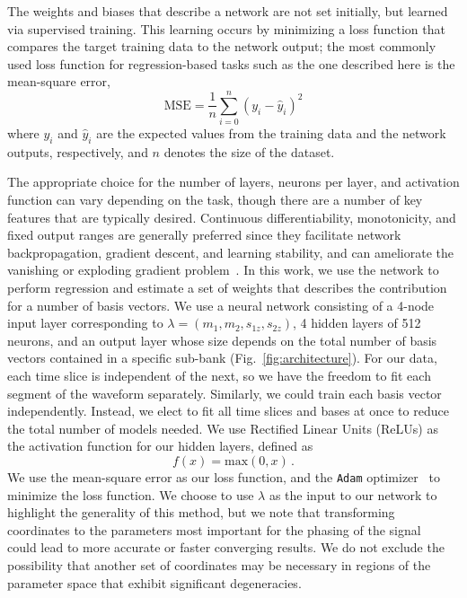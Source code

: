 \documentclass[twocolumn,prd,superscriptaddress,nofootinbib]{revtex4-1}
\begin{document}
The
weights and biases that describe a network are not set initially, but learned
via supervised training. This learning occurs by minimizing a loss function
that compares the target training data to the network output; the most commonly
used loss function for regression-based tasks such as the one described here is the mean-square error,
\begin{equation}
\mathrm{MSE} = \frac{1}{n}\sum_{i = 0}^{n} (y_i - \hat{y}_i)^2
\end{equation}
where $y_i$ and $\hat{y}_i$ are the expected values from the
training data and the network outputs, respectively, and $n$ denotes the size of the dataset.

The appropriate choice for the number of layers, neurons per layer, and
activation function can vary depending on the task, though there are a number of
key features that are typically desired. Continuous differentiability, monotonicity,
and fixed output ranges are generally preferred since they facilitate network
backpropagation, gradient descent, and learning stability, and can ameliorate the
vanishing or exploding gradient problem~\cite{Goodfellow-et-al-2016}. In this
work,
we use the network to perform regression and estimate a set of weights that
describes the contribution for a number of basis vectors. We use a neural
network consisting of a 4-node input layer corresponding to $\lambda = (m_1, m_2, s_{1z},
s_{2z})$, 4 hidden layers of 512 neurons, and an output layer whose size
depends on the total number of basis vectors contained in a specific sub-bank
(Fig.~\ref{fig:architecture}). For our data, each time slice is independent of
the next, so we have the freedom to fit each segment of the waveform
separately.  Similarly, we could train each basis vector independently.
Instead, we elect to fit all time slices and bases at once to reduce the total
number of models needed. We use Rectified Linear Units (ReLUs) as the
activation function for our hidden layers, defined as
\begin{equation}
f(x) = \mathrm{max}(0,x) \,.
\end{equation}
We use the mean-square error as our
loss function, and the \texttt{Adam} optimizer~\cite{Kingma:2014vow} to
minimize the loss function. We choose to use $\lambda$ as
the input to our network to highlight the generality of this method, but we note that transforming coordinates to
the parameters most important for the phasing of the
signal~\cite{Cutler:1994ys,Morisaki:2020oqk} could lead to more accurate or faster converging results. We do not exclude the possibility that another set of coordinates may be necessary in regions of the parameter space that exhibit significant degeneracies.
\end{document}
